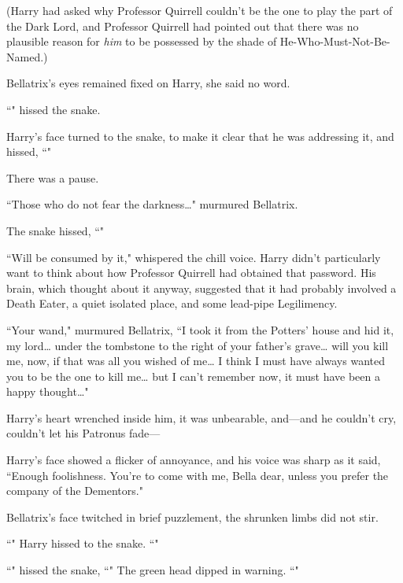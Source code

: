 (Harry had asked why Professor Quirrell couldn't be the one to play the part of the Dark Lord, and Professor Quirrell had pointed out that there was no plausible reason for \emph{him} to be possessed by the shade of He-Who-Must-Not-Be-Named.)

Bellatrix's eyes remained fixed on Harry, she said no word.

``" hissed the snake.

Harry's face turned to the snake, to make it clear that he was addressing it, and hissed, ``"

There was a pause.

``Those who do not fear the darkness{\ldots}" murmured Bellatrix.

The snake hissed, ``"

``Will be consumed by it," whispered the chill voice. Harry didn't particularly want to think about how Professor Quirrell had obtained that password. His brain, which thought about it anyway, suggested that it had probably involved a Death Eater, a quiet isolated place, and some lead-pipe Legilimency.

``Your wand," murmured Bellatrix, ``I took it from the Potters' house and hid it, my lord{\ldots} under the tombstone to the right of your father's grave{\ldots} will you kill me, now, if that was all you wished of me{\ldots} I think I must have always wanted you to be the one to kill me{\ldots} but I can't remember now, it must have been a happy thought{\ldots}"

Harry's heart wrenched inside him, it was unbearable, and---and he couldn't cry, couldn't let his Patronus fade---

Harry's face showed a flicker of annoyance, and his voice was sharp as it said, ``Enough foolishness. You're to come with me, Bella dear, unless you prefer the company of the Dementors."

Bellatrix's face twitched in brief puzzlement, the shrunken limbs did not stir.

``" Harry hissed to the snake. ``"

``" hissed the snake, ``" The green head dipped in warning. ``"

